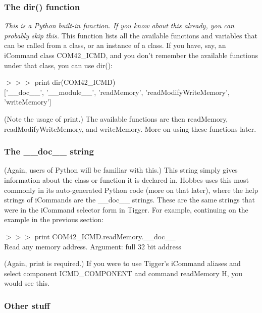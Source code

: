 %
%
\subsubsection{The dir() function}
\label{3.1.2}

\emph{This is a Python built-in function. If you know about this already, you can probably skip this.}
This function lists all the available functions and variables that can be called from a class, or an instance of a class. If you have, say, an iCommand class COM42\_ICMD, and you don't remember the available functions under that class, you can use dir():

\vspace{12pt}
\noindent $>>>$ print dir(COM42\_ICMD) \\ $[$'\_\_doc\_\_', '\_\_module\_\_', 'readMemory', 'readModifyWriteMemory', 'writeMemory']
\vspace{12pt}

(Note the usage of print.) The available functions are then readMemory, readModifyWriteMemory, and writeMemory. More on using these functions later.



%
%
\subsubsection{The \_\_doc\_\_ string}
\label{3.1.3}

(Again, users of Python will be familiar with this.)
This string simply gives information about the class or function it is declared in. Hobbes uses this most commonly in its auto-generated Python code (more on that later), where the help strings of iCommands are the \_\_doc\_\_ strings. These are the same strings that were in the iCommand selector form in Tigger. For example, continuing on the example in the previous section:

\vspace{12pt}
\noindent $>>>$ print COM42\_ICMD.readMemory.\_\_doc\_\_ \\ Read any memory address. Argument: full 32 bit address
\vspace{12pt}

(Again, print is required.) If you were to use Tigger's iCommand aliases and select component ICMD\_COMPONENT and command readMemory H, you would see this.



%
%
\subsubsection{Other stuff}
\label{3.1.4}

